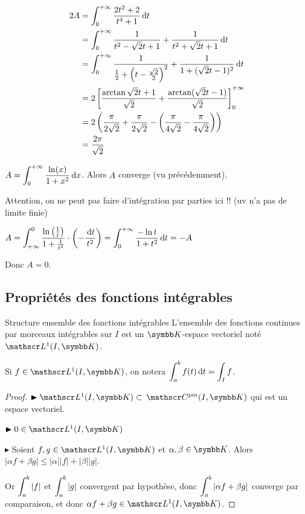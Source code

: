 \begin{exemple}
    \begin{align}
        2A & = \displaystyle \int_{0}^{+ \infty} \frac{2t^2 + 2}{t^4 + 1} \,\mathrm{d}t  \\
        & = \int_{0 }^{+ \infty   } \frac 1 {t^2 - \sqrt 2 t + 1} + \frac{ 1 }{ t^2 + \sqrt 2 t + 1 } \,\mathrm{d}t \\
        & = \int_{0}^{+ \infty   } \frac 1 {\frac 1 2 + \left( t - \frac{\sqrt 2 }{2} \right)^2} + \frac 1 {1 + (\sqrt 2 t - 1)^2} \,\mathrm{d}t \\
        & = 2 \left[ \frac{\arctan \sqrt 2 t + 1}{\sqrt 2  } + \frac{\arctan (\sqrt 2 t - 1)}{ \sqrt 2  } \right]_0^{+ \infty} \\
        & = 2 \left( \frac \pi {2 \sqrt 2} + \frac \pi {2 \sqrt 2} - \left( \frac \pi {4 \sqrt 2} - \frac \pi {4 \sqrt 2} \right) \right) \\
        & = \frac{2 \pi }{ \sqrt 2 }
    \end{align}
\end{exemple}


\begin{exemple}
    $A = \displaystyle \int_{0}^{+ \infty   } \frac{\ln (x) }{1 + x^2} \,\mathrm{d}x$. Alors $A$ converge (vu précédemment). 

    Attention, on ne peut pas faire d'intégration par parties ici !! (uv n'a pas de limite finie)

    $A = \displaystyle \int_{+ \infty }^{0 } \frac{\ln \left( \frac 1 t \right) }{1 + \frac 1 {t^2} } \cdot \left( - \frac {\,\mathrm{d}t} {t^2} \right) = \int_0^{+ \infty   } \frac{- \ln t }{1 + t^2} \,\mathrm{d}t = - A$

    Donc $A = 0$. 
\end{exemple}



\subsection{Propriétés des fonctions intégrables }

\begin{proposition}{Structure ensemble des fonctions intégrables}{}
    L'ensemble des fonctions continues par morceaux intégrables sur $I$ est un 
    $\K$-espace vectoriel noté $\mathscr L^1(I, \K)$.

    Si $f \in \mathscr L^1(I, \K)$, on notera $\displaystyle \int_{a}^{b } f(t) \,\mathrm{d}t = \int_{I } f$.
\end{proposition}

\begin{proof}
    $\blacktriangleright \mathscr L^1(I, \K) \subset \mc {pm}(I, \K)$ qui est un espace vectoriel. 

    $\blacktriangleright 0 \in \mathscr L^1(I, \K)$ 

    $\blacktriangleright$ Soient $f, g \in \mathscr L^1(I, \K)$ et $\alpha, \beta \in \K$. Alors 
    $\mid \alpha f + \beta g \mid \leqslant |\alpha| |f| + |\beta| |g|$.

    Or $\displaystyle \int_{a }^{b } |f|$ et $\displaystyle \int_{a }^{b } |g|$ convergent par hypothèse, 
    donc $\displaystyle \int_{a }^{b } |\alpha f + \beta g|$ converge par comparaison, 
    et donc $\alpha f + \beta g \in \mathscr L^1(I, \K)$.
\end{proof}

